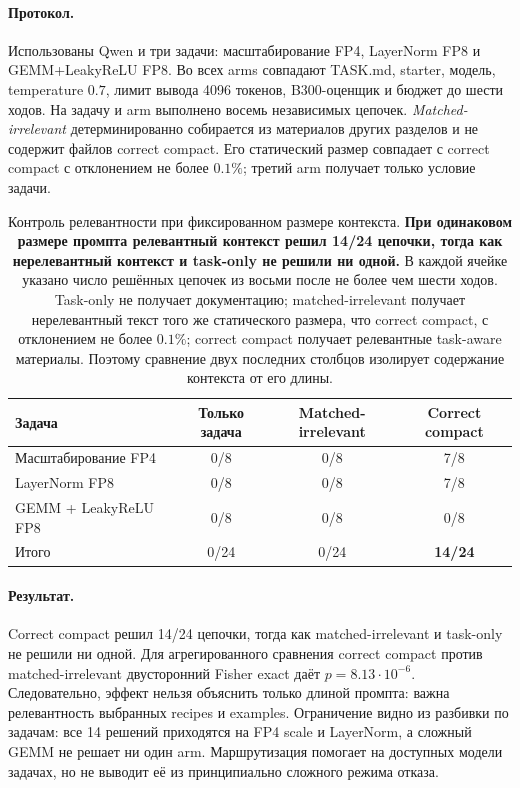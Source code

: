 \documentclass[10pt,a4paper]{article}
\begin{document}
\paragraph{Протокол.}
Использованы Qwen и три задачи: масштабирование FP4, LayerNorm FP8 и
GEMM+LeakyReLU FP8. Во всех arms совпадают TASK.md, starter, модель,
temperature $0.7$, лимит вывода 4096 токенов, B300-оценщик и бюджет до шести
ходов. На задачу и arm выполнено восемь независимых цепочек.
\emph{Matched-irrelevant} детерминированно собирается из материалов других
разделов и не содержит файлов correct compact. Его статический размер совпадает
с correct compact с отклонением не более $0.1\%$; третий arm получает только
условие задачи.

\begin{table}[h]
\centering\footnotesize
\caption{Контроль релевантности при фиксированном размере контекста. \textbf{При одинаковом размере промпта релевантный контекст решил 14/24 цепочки, тогда как нерелевантный контекст и task-only не решили ни одной.} В каждой ячейке указано число решённых цепочек из восьми после не более чем шести ходов. Task-only не получает документацию; matched-irrelevant получает нерелевантный текст того же статического размера, что correct compact, с отклонением не более $0.1\%$; correct compact получает релевантные task-aware материалы. Поэтому сравнение двух последних столбцов изолирует содержание контекста от его длины.}
\label{tab:context-relevance}
\begin{tabular}{lccc}
\toprule
Задача & Только задача & Matched-irrelevant & Correct compact \\
\midrule
Масштабирование FP4   & 0/8 & 0/8 & 7/8 \\
LayerNorm FP8         & 0/8 & 0/8 & 7/8 \\
GEMM + LeakyReLU FP8  & 0/8 & 0/8 & 0/8 \\
\midrule
Итого                  & 0/24 & 0/24 & \textbf{14/24} \\
\bottomrule
\end{tabular}
\end{table}

\paragraph{Результат.}
Correct compact решил 14/24 цепочки, тогда как matched-irrelevant и task-only
не решили ни одной. Для агрегированного сравнения correct compact против
matched-irrelevant двусторонний Fisher exact даёт $p=8.13\cdot10^{-6}$.
Следовательно, эффект нельзя объяснить только длиной промпта: важна
релевантность выбранных recipes и examples. Ограничение видно из разбивки по
задачам: все 14 решений приходятся на FP4 scale и LayerNorm, а сложный GEMM не
решает ни один arm. Маршрутизация помогает на доступных модели задачах, но не
выводит её из принципиально сложного режима отказа.
\end{document}
